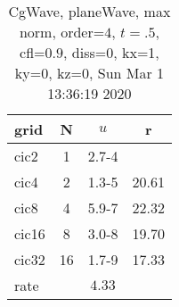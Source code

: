 \begin{table}[H]\tableFont %
\begin{center}
\begin{tabular}{|l|c|c|c|} \hline 
grid  & N &  $ u $ & r \\ \hline 
      cic2 &     1 & \num{2.7}{-4} &       \\ \hline
      cic4 &     2 & \num{1.3}{-5} & 20.61  \\ \hline
      cic8 &     4 & \num{5.9}{-7} & 22.32  \\ \hline
     cic16 &     8 & \num{3.0}{-8} & 19.70  \\ \hline
     cic32 &    16 & \num{1.7}{-9} & 17.33  \\ \hline
    rate             &       &  $4.33$       &       \\ \hline
\end{tabular}
\caption{CgWave, planeWave, max norm, order=$4$, $t=.5$, cfl=$0.9$, diss=$0$, kx=1, ky=0, kz=0, Sun Mar  1 13:36:19 2020}\label{table:planeWaveOrder4max}
\end{center}
\end{table}
